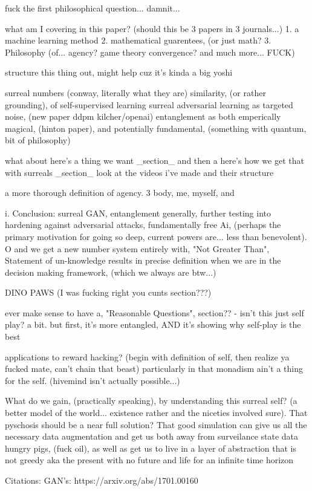 \documentclass{article}
\begin{document}
fuck the first philosophical question... damnit...

what am I covering in this paper? (should this be 3 papers in 3 journals...)
1. a machine learning method
2. mathematical guarentees, (or just math?
3. Philosophy (of... agency? game theory convergence? and much more... FUCK) 


structure this thing out, might help cuz it's kinda a big yoshi

surreal numbers (conway, literally what they are)
similarity, (or rather grounding), of self-supervised learning
surreal adversarial learning as targeted noise, (new paper ddpm kilcher/openai)
entanglement as both emperically magical, (hinton paper), and potentially fundamental, (something with quantum, bit of philosophy)

what about here's a thing we want _section_ and then a here's how we get that with surreals _section_
look at the videos i've made and their structure

a more thorough definition of agency. 3 body, me, myself, and 

i. 
Conclusion: surreal GAN, entanglement generally, further testing into hardening against adversarial attacks, fundamentally free Ai, (perhaps the primary motivation for going so deep, current powers are... less than benevolent).  O and we get a new number system entirely with, "Not Greater Than", Statement of un-knowledge results in precise definition when we are in the decision making framework, (which we always are btw...)

DINO PAWS (I was fucking right you cunts section???)


ever make sense to have a, "Reasonable Questions", section??
 - isn't this just self play? a bit. but first, it's more entangled, AND it's showing why self-play is the best

applications to reward hacking? (begin with definition of self, then realize ya fucked mate, can't chain that beast)
	particularly in that monadism ain't a thing for the self. (hivemind isn't actually possible...)


What do we gain, (practically speaking), by understanding this surreal self? (a better model of the world... existence rather and the niceties involved sure). That pyschosis should be a near full solution? That good simulation can give us all the necessary data augmentation and get us both away from surveilance state data hungry pigs, (fuck oil), as well as get us to live in a layer of abstraction that is not greedy aka the present with no future and life for an infinite time horizon

Citations: 
GAN's: https://arxiv.org/abs/1701.00160
\end{document}
